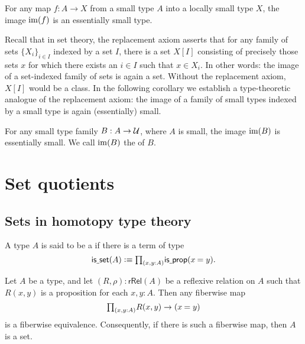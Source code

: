 \begin{thm}\label{thm:image_small}
For any map $f:A\to X$ from a small type $A$ into a locally small type $X$, the image $\operatorname{im}(f)$ is an essentially small type.
\end{thm}

Recall that in set theory, the replacement axiom asserts that for any family of sets $\{X_i\}_{i\in I}$ indexed by a set $I$, there is a set $X[I]$ consisting of precisely those sets $x$ for which there exists an $i\in I$ such that $x\in X_i$. In other words: the image of a set-indexed family of sets is again a set. Without the replacement axiom, $X[I]$ would be a class. In the following corollary we establish a type-theoretic analogue of the replacement axiom: the image of a family of small types indexed by a small type is again (essentially) small.

\begin{cor}\label{cor:im_small}
For any small type family $B:A\to\mathcal{U}$, where $A$ is small, the image $\operatorname{im}(B)$ is essentially small. We call $\operatorname{im}(B)$ the  of $B$. 
\end{cor}

\section{Set quotients}\label{sec:set-quotients}

\subsection{Sets in homotopy type theory}
\begin{defn}
A type $A$ is said to be a  if there is a term of type
\begin{equation*}
\isset(A)\defeq \prd{x,y:A}\isprop(\id{x}{y}).
\end{equation*}
\end{defn}

\begin{lem}\label{lem:prop_to_id}
Let $A$ be a type, and let $(R,\rho):\mathsf{rRel}(A)$ be a reflexive relation on $A$ such that $R(x,y)$ is a proposition for each $x,y:A$. Then any fiberwise map
\begin{equation*}
\prd{x,y:A}R(x,y)\to (\id{x}{y})
\end{equation*}
is a fiberwise equivalence. Consequently, if there is such a fiberwise map, then $A$ is a set.
\end{lem}


